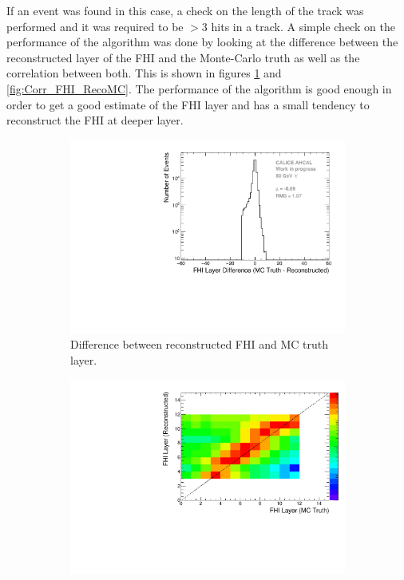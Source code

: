 If an event was found in this case, a check on the length of the track was performed and it was required to be $>3$ hits in a track. A simple check on the performance of the algorithm was done by looking at the difference between the reconstructed layer of the FHI and the Monte-Carlo truth as well as the correlation between both. This is shown in figures \ref{fig:Diff_FHI_RecoMC} and \ref{fig:Corr_FHI_RecoMC}. The performance of the algorithm is good enough in order to get a good estimate of the FHI layer and has a small tendency to reconstruct the FHI at deeper layer.

\begin{figure}[htbp!]
	\begin{subfigure}[t]{0.5\textwidth}
		\centering
		\includegraphics[width=1\textwidth]{../Thesis_Plots/Timing/Pions/Plots/ShowerStart_Difference_noOptimisation.pdf}
		\caption{Difference between reconstructed FHI and MC truth layer.}\label{fig:Diff_FHI_RecoMC}
	\end{subfigure}
	\hfill
	\begin{subfigure}[t]{0.5\textwidth}
		\centering
		\includegraphics[width=1\textwidth]{../Thesis_Plots/Timing/Pions/Plots/ShowerStart_Difference_noOptimisation_2D.pdf}

\end{subfigure}
\end{figure}
